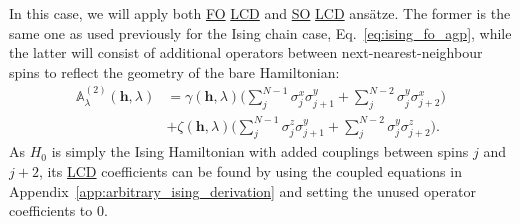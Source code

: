 \documentclass[a4paper,oneside,11pt]{book}
\newcommand{\hbb}{\boldsymbol{h}}
\newcommand{\sx}{\sigma^x}
\newcommand{\sy}{\sigma^y}
\newcommand{\sz}{\sigma^z}
\newcommand{\approxAGP}{\mathbb{A}_{\lambda}}
\newcommand{\acrref}[1]{\hyperref[acr:#1]{#1}}
\begin{document}
In this case, we will apply both \acrref{FO} \acrref{LCD} and \acrref{SO} \acrref{LCD} ans\"{a}tze. The former is the same one as used previously for the Ising chain case, Eq.~\eqref{eq:ising_fo_agp}, while the latter will consist of additional operators between next-nearest-neighbour spins to reflect the geometry of the bare Hamiltonian:
\begin{equation}\label{eq:ghz_so_lcd}
    \begin{aligned}
        \approxAGP^{(2)}(\hbb, \lambda) &= \gamma(\hbb, \lambda) \Big( \sum_{j}^{N-1} \sx_j \sy_{j+1} + \sum_{j}^{N-2} \sy_j \sx_{j+2} \Big) \\
        &+ \zeta(\hbb, \lambda) \Big( \sum_{j}^{N-1} \sz_j \sy_{j+1} + \sum_{j}^{N-2} \sy_j \sz_{j+2} \Big).
    \end{aligned}
\end{equation}
As $H_0$ is simply the Ising Hamiltonian with added couplings between spins $j$ and $j+2$, its \acrref{LCD} coefficients can be found by using the coupled equations in Appendix~\ref{app:arbitrary_ising_derivation} and setting the unused operator coefficients to $0$. 
\end{document}
